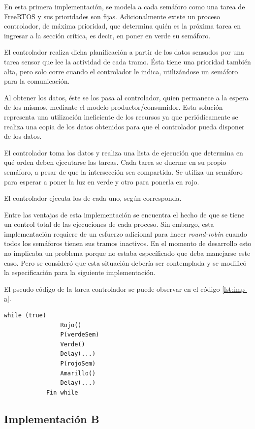 		En esta primera implementación, se modela a cada semáforo como una tarea de FreeRTOS y sus prioridades son fijas.
		Adicionalmente existe un proceso controlador, de máxima prioridad, que determina quién es la próxima tarea en ingresar a la sección crítica, es decir, en poner en verde su semáforo.

		El controlador realiza dicha planificación a partir de los datos sensados por una tarea sensor que lee la actividad de cada tramo.
		Ésta tiene una prioridad también alta, pero solo corre cuando el controlador le indica, utilizándose un semáforo para la comunicación.

		Al obtener los datos, éste se los pasa al controlador, quien permanece a la espera de los mismos, mediante el modelo productor/consumidor.
		Esta solución representa una utilización ineficiente de los recursos ya que periódicamente se realiza una copia de los datos obtenidos para que el controlador pueda disponer de los datos.

		El controlador toma los datos y realiza una lista de ejecución que determina en qué orden deben ejecutarse las tareas.
		Cada tarea se duerme en su propio semáforo, a pesar de que la intersección sea compartida.
		Se utiliza un semáforo para esperar a poner la luz en verde y otro para ponerla en rojo.

		El controlador ejecuta los  de cada uno, según corresponda.

		Entre las ventajas de esta implementación se encuentra el hecho de que se tiene un control total de las ejecuciones de cada proceso.
		Sin embargo, esta implementación requiere de un esfuerzo adicional para hacer \emph{round-robin} cuando todos los semáforos tienen sus tramos inactivos.
		En el momento de desarrollo esto no implicaba un problema porque no estaba específicado que deba manejarse este caso.
		Pero se consideró que esta situación debería ser contemplada y se modificó la especificación para la siguiente implementación.

		El pseudo código de la tarea controlador se puede observar en el código \ref{lst:imp-a}.

		\begin{lstlisting}[float, label=lst:imp-a, caption=Pseudocódigo de la tarea controlador.]
			while (true)
				Rojo()
				P(verdeSem)
				Verde()
				Delay(...)
				P(rojoSem)
				Amarillo()
				Delay(...)
			Fin while
		\end{lstlisting}



	\subsection{Implementación B}

